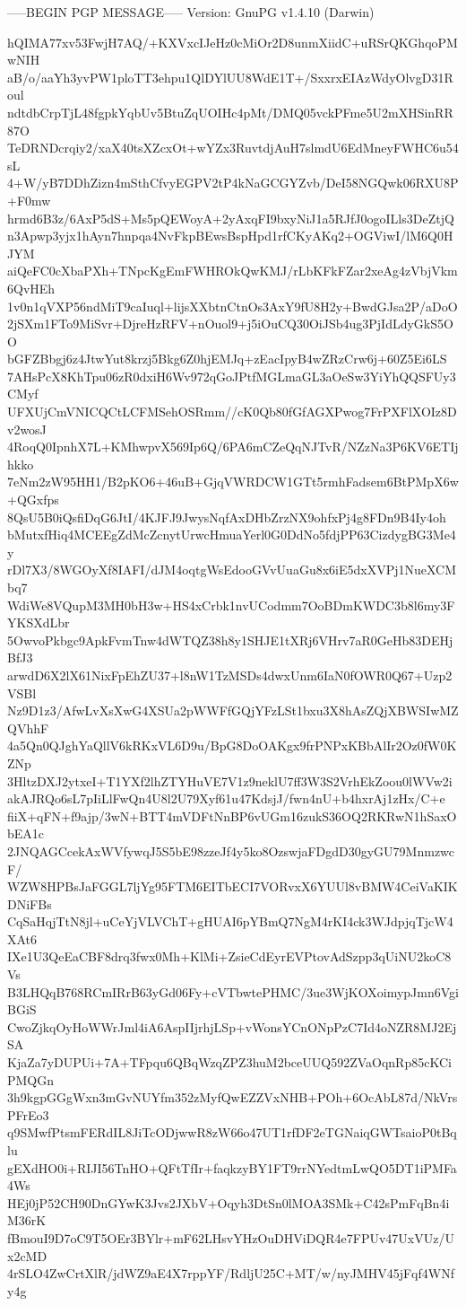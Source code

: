 -----BEGIN PGP MESSAGE-----
Version: GnuPG v1.4.10 (Darwin)

hQIMA77xv53FwjH7AQ/+KXVxcIJeHz0cMiOr2D8unmXiidC+uRSrQKGhqoPMwNIH
aB/o/aaYh3yvPW1ploTT3ehpu1QlDYlUU8WdE1T+/SxxrxEIAzWdyOlvgD31Roul
ndtdbCrpTjL48fgpkYqbUv5BtuZqUOIHc4pMt/DMQ05vckPFme5U2mXHSinRR87O
TeDRNDcrqiy2/xaX40tsXZcxOt+wYZx3RuvtdjAuH7slmdU6EdMneyFWHC6u54sL
4+W/yB7DDhZizn4mSthCfvyEGPV2tP4kNaGCGYZvb/DeI58NGQwk06RXU8P+F0mw
hrmd6B3z/6AxP5dS+Ms5pQEWoyA+2yAxqFI9bxyNiJ1a5RJfJ0ogoILls3DeZtjQ
n3Apwp3yjx1hAyn7hnpqa4NvFkpBEwsBspHpd1rfCKyAKq2+OGViwI/lM6Q0HJYM
aiQeFC0cXbaPXh+TNpcKgEmFWHROkQwKMJ/rLbKFkFZar2xeAg4zVbjVkm6QvHEh
1v0n1qVXP56ndMiT9caIuql+lijsXXbtnCtnOs3AxY9fU8H2y+BwdGJsa2P/aDoO
2jSXm1FTo9MiSvr+DjreHzRFV+nOuol9+j5iOuCQ30OiJSb4ug3PjIdLdyGkS5OO
bGFZBbgj6z4JtwYut8krzj5Bkg6Z0hjEMJq+zEacIpyB4wZRzCrw6j+60Z5Ei6LS
7AHsPcX8KhTpu06zR0dxiH6Wv972qGoJPtfMGLmaGL3aOeSw3YiYhQQSFUy3CMyf
UFXUjCmVNICQCtLCFMSehOSRmm//cK0Qb80fGfAGXPwog7FrPXFlXOIz8Dv2wosJ
4RoqQ0IpnhX7L+KMhwpvX569Ip6Q/6PA6mCZeQqNJTvR/NZzNa3P6KV6ETIjhkko
7eNm2zW95HH1/B2pKO6+46uB+GjqVWRDCW1GTt5rmhFadsem6BtPMpX6w+QGxfps
8QsU5B0iQsfiDqG6JtI/4KJFJ9JwysNqfAxDHbZrzNX9ohfxPj4g8FDn9B4Iy4oh
bMutxfHiq4MCEEgZdMcZcnytUrwcHmuaYerl0G0DdNo5fdjPP63CizdygBG3Me4y
rDl7X3/8WGOyXf8IAFI/dJM4oqtgWsEdooGVvUuaGu8x6iE5dxXVPj1NueXCMbq7
WdiWe8VQupM3MH0bH3w+HS4xCrbk1nvUCodmm7OoBDmKWDC3b8l6my3FYKSXdLbr
5OwvoPkbgc9ApkFvmTnw4dWTQZ38h8y1SHJE1tXRj6VHrv7aR0GeHb83DEHjBfJ3
arwdD6X2lX61NixFpEhZU37+l8nW1TzMSDs4dwxUnm6IaN0fOWR0Q67+Uzp2VSBl
Nz9D1z3/AfwLvXsXwG4XSUa2pWWFfGQjYFzLSt1bxu3X8hAsZQjXBWSIwMZQVhhF
4a5Qn0QJghYaQllV6kRKxVL6D9u/BpG8DoOAKgx9frPNPxKBbAlIr2Oz0fW0KZNp
3HltzDXJ2ytxeI+T1YXf2lhZTYHuVE7V1z9neklU7ff3W3S2VrhEkZoou0lWVw2i
akAJRQo6sL7pIiLlFwQn4U8l2U79Xyf61u47KdsjJ/fwn4nU+b4hxrAj1zHx/C+e
fiiX+qFN+f9ajp/3wN+BTT4mVDFtNnBP6vUGm16zukS36OQ2RKRwN1hSaxObEA1c
2JNQAGCcekAxWVfywqJ5S5bE98zzeJf4y5ko8OzswjaFDgdD30gyGU79MnmzwcF/
WZW8HPBsJaFGGL7ljYg95FTM6EITbECI7VORvxX6YUUl8vBMW4CeiVaKIKDNiFBs
CqSaHqjTtN8jl+uCeYjVLVChT+gHUAI6pYBmQ7NgM4rKI4ck3WJdpjqTjcW4XAt6
IXe1U3QeEaCBF8drq3fwx0Mh+KlMi+ZsieCdEyrEVPtovAdSzpp3qUiNU2koC8Vs
B3LHQqB768RCmIRrB63yGd06Fy+cVTbwtePHMC/3ue3WjKOXoimypJmn6VgiBGiS
CwoZjkqOyHoWWrJml4iA6AspIIjrhjLSp+vWonsYCnONpPzC7Id4oNZR8MJ2EjSA
KjaZa7yDUPUi+7A+TFpqu6QBqWzqZPZ3huM2bceUUQ592ZVaOqnRp85cKCiPMQGn
3h9kgpGGgWxn3mGvNUYfm352zMyfQwEZZVxNHB+POh+6OcAbL87d/NkVrsPFrEo3
q9SMwfPtsmFERdIL8JiTcODjwwR8zW66o47UT1rfDF2eTGNaiqGWTsaioP0tBqlu
gEXdHO0i+RIJI56TnHO+QFtTfIr+faqkzyBY1FT9rrNYedtmLwQO5DT1iPMFa4Ws
HEj0jP52CH90DnGYwK3Jvs2JXbV+Oqyh3DtSn0lMOA3SMk+C42sPmFqBn4iM36rK
fBmouI9D7oC9T5OEr3BYlr+mF62LHsvYHzOuDHViDQR4e7FPUv47UxVUz/Ux2cMD
4rSLO4ZwCrtXlR/jdWZ9aE4X7rppYF/RdljU25C+MT/w/nyJMHV45jFqf4WNfy4g

